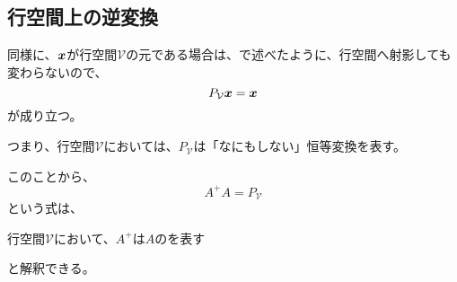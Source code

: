 \documentclass[../../../topic_linear-algebra]{subfiles}
\begin{document}
\subsection{行空間上の逆変換}

同様に、$\vb*{x}$が行空間$\mathcal{V}$の元である場合は、で述べたように、行空間へ射影しても変わらないので、
\begin{equation*}
  P_{\mathcal{V}} \vb*{x} = \vb*{x}
\end{equation*}
が成り立つ。

つまり、行空間$\mathcal{V}$においては、$P_{\mathcal{V}}$は「なにもしない」恒等変換を表す。

\br

このことから、
\begin{equation*}
  A^+ A = P_{\mathcal{V}}
\end{equation*}
という式は、
\begin{emphabox}
  \begin{spacebox}
    \begin{center}
      行空間$\mathcal{V}$において、$A^+$は$A$のを表す
    \end{center}
  \end{spacebox}
\end{emphabox}
と解釈できる。
\end{document}
